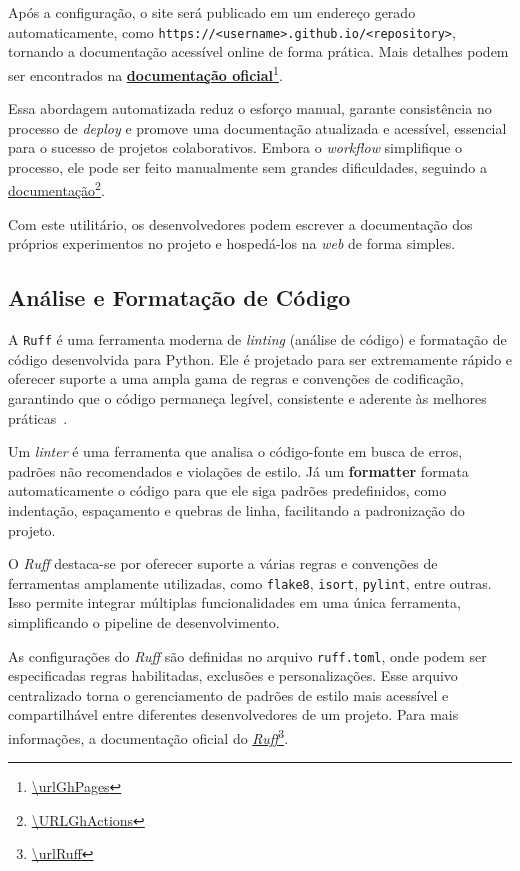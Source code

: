 Após a configuração, o site será publicado em um endereço gerado automaticamente, como \texttt{https://<username>.github.io/<repository>}, tornando a documentação acessível online de forma prática. Mais detalhes podem ser encontrados na \href{\urlGhPages}{\textbf{documentação oficial}}\footnote{\url{\urlGhPages}}.

Essa abordagem automatizada reduz o esforço manual, garante consistência no processo de \textit{deploy} e promove uma documentação atualizada e acessível, essencial para o sucesso de projetos colaborativos. Embora o \textit{workflow} simplifique o processo, ele pode ser feito manualmente sem grandes dificuldades, seguindo a \href{\URLGhActions}{documentação}\footnote{\url{\URLGhActions}}.

Com este utilitário, os desenvolvedores podem escrever a documentação dos próprios experimentos no projeto e hospedá-los na \textit{web} de forma simples.

\subsection{Análise e Formatação de Código}

A \texttt{Ruff} é uma ferramenta moderna de \textit{linting} (análise de código) e formatação de código desenvolvida para Python. Ele é projetado para ser extremamente rápido e oferecer suporte a uma ampla gama de regras e convenções de codificação, garantindo que o código permaneça legível, consistente e aderente às melhores práticas~\cite{ruff-docs}.

Um \textit{linter} é uma ferramenta que analisa o código-fonte em busca de erros, padrões não recomendados e violações de estilo. Já um \textbf{formatter} formata automaticamente o código para que ele siga padrões predefinidos, como indentação, espaçamento e quebras de linha, facilitando a padronização do projeto.

O \textit{Ruff} destaca-se por oferecer suporte a várias regras e convenções de ferramentas amplamente utilizadas, como \texttt{flake8}, \texttt{isort}, \texttt{pylint}, entre outras. Isso permite integrar múltiplas funcionalidades em uma única ferramenta, simplificando o pipeline de desenvolvimento.

As configurações do \textit{Ruff} são definidas no arquivo \texttt{ruff.toml}, onde podem ser especificadas regras habilitadas, exclusões e personalizações. Esse arquivo centralizado torna o gerenciamento de padrões de estilo mais acessível e compartilhável entre diferentes desenvolvedores de um projeto. Para mais informações, a documentação oficial do \href{\urlRuff}{\textit{Ruff}}\footnote{\url{\urlRuff}}.

